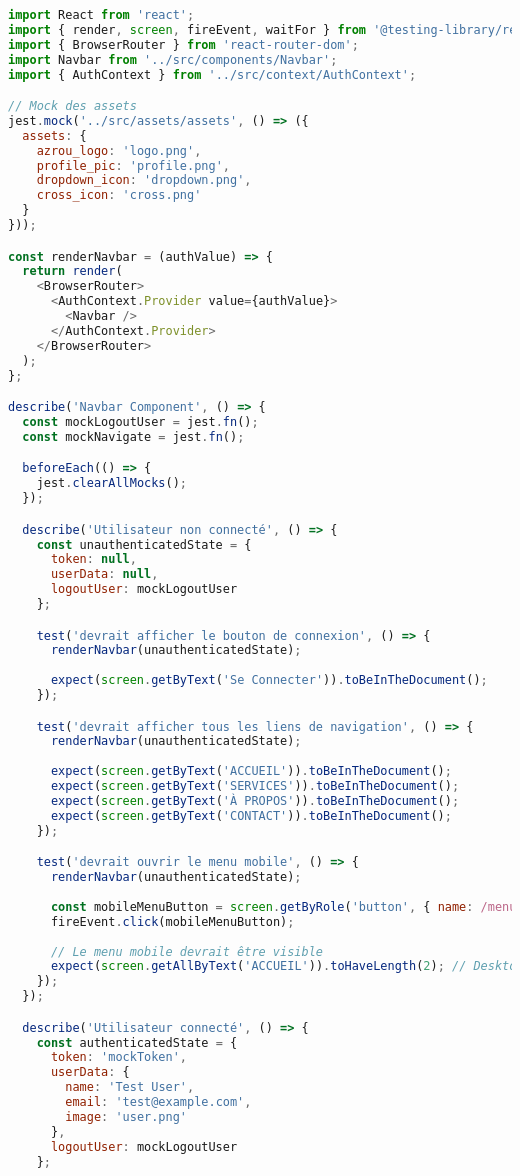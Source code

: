 \begin{lstlisting}[language=JavaScript, caption=Navbar.test.jsx]
import React from 'react';
import { render, screen, fireEvent, waitFor } from '@testing-library/react';
import { BrowserRouter } from 'react-router-dom';
import Navbar from '../src/components/Navbar';
import { AuthContext } from '../src/context/AuthContext';

// Mock des assets
jest.mock('../src/assets/assets', () => ({
  assets: {
    azrou_logo: 'logo.png',
    profile_pic: 'profile.png',
    dropdown_icon: 'dropdown.png',
    cross_icon: 'cross.png'
  }
}));

const renderNavbar = (authValue) => {
  return render(
    <BrowserRouter>
      <AuthContext.Provider value={authValue}>
        <Navbar />
      </AuthContext.Provider>
    </BrowserRouter>
  );
};

describe('Navbar Component', () => {
  const mockLogoutUser = jest.fn();
  const mockNavigate = jest.fn();

  beforeEach(() => {
    jest.clearAllMocks();
  });

  describe('Utilisateur non connecté', () => {
    const unauthenticatedState = {
      token: null,
      userData: null,
      logoutUser: mockLogoutUser
    };

    test('devrait afficher le bouton de connexion', () => {
      renderNavbar(unauthenticatedState);
      
      expect(screen.getByText('Se Connecter')).toBeInTheDocument();
    });

    test('devrait afficher tous les liens de navigation', () => {
      renderNavbar(unauthenticatedState);
      
      expect(screen.getByText('ACCUEIL')).toBeInTheDocument();
      expect(screen.getByText('SERVICES')).toBeInTheDocument();
      expect(screen.getByText('À PROPOS')).toBeInTheDocument();
      expect(screen.getByText('CONTACT')).toBeInTheDocument();
    });

    test('devrait ouvrir le menu mobile', () => {
      renderNavbar(unauthenticatedState);
      
      const mobileMenuButton = screen.getByRole('button', { name: /menu/i });
      fireEvent.click(mobileMenuButton);
      
      // Le menu mobile devrait être visible
      expect(screen.getAllByText('ACCUEIL')).toHaveLength(2); // Desktop + mobile
    });
  });

  describe('Utilisateur connecté', () => {
    const authenticatedState = {
      token: 'mockToken',
      userData: {
        name: 'Test User',
        email: 'test@example.com',
        image: 'user.png'
      },
      logoutUser: mockLogoutUser
    };


\end{lstlisting}

